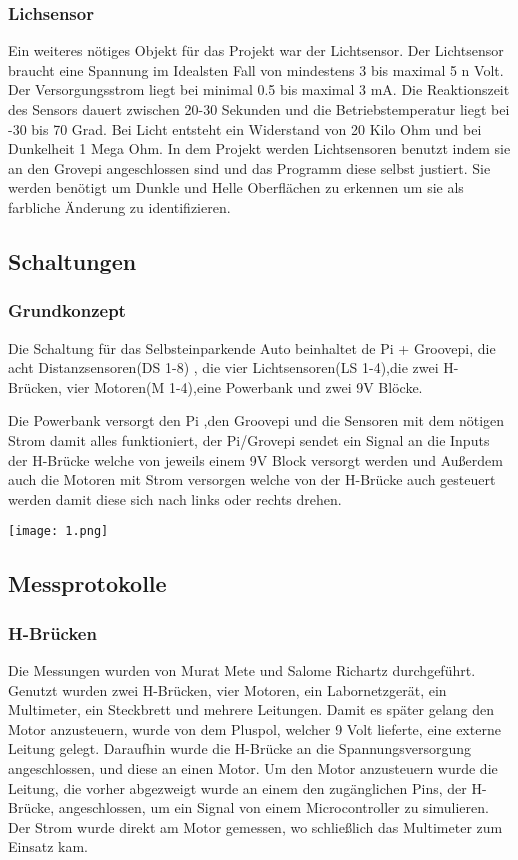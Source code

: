 \documentclass[notitlepage]{report}
\begin{document}
\subsubsection{Lichsensor}

Ein weiteres n\"{o}tiges Objekt f\"{u}r das Projekt war der Lichtsensor. Der Lichtsensor braucht eine Spannung im Idealsten Fall von mindestens 3 bis maximal 5 n Volt. Der Versorgungsstrom liegt bei minimal 0.5 bis maximal 3 mA. Die Reaktionszeit des Sensors dauert zwischen 20-30 Sekunden und die Betriebstemperatur liegt bei -30 bis 70 Grad.  Bei Licht entsteht ein Widerstand von 20 Kilo Ohm und bei Dunkelheit 1 Mega Ohm. In dem Projekt werden Lichtsensoren benutzt indem sie an den Grovepi angeschlossen sind und das Programm diese selbst justiert. Sie werden ben\"{o}tigt um Dunkle und Helle Oberfl\"{a}chen zu erkennen um sie als farbliche \"{A}nderung zu identifizieren. 

\subsection{Schaltungen}

\subsubsection{Grundkonzept}

Die Schaltung f\"{u}r das Selbsteinparkende Auto beinhaltet de Pi + Groovepi, die acht Distanzsensoren(DS 1-8) , die vier Lichtsensoren(LS 1-4),die zwei H-Br\"{u}cken, vier Motoren(M 1-4),eine Powerbank und zwei 9V Bl\"{o}cke.

Die Powerbank versorgt den Pi ,den Groovepi und die Sensoren mit dem n\"{o}tigen Strom damit alles funktioniert, der Pi/Grovepi sendet ein Signal an die Inputs der H-Br\"{u}cke welche von jeweils einem 9V Block versorgt werden und Au{\ss}erdem auch die Motoren mit Strom versorgen welche von der H-Br\"{u}cke auch gesteuert werden damit diese sich nach links oder rechts drehen.

\texttt{[image: 1.png]}

\subsection{Messprotokolle}

\subsubsection{H-Br\"{u}cken}
Die Messungen wurden von Murat Mete und Salome Richartz durchgef\"{u}hrt. Genutzt wurden zwei H-Br\"{u}cken, vier Motoren, ein Labornetzger\"{a}t, ein Multimeter, ein Steckbrett und mehrere Leitungen. Damit es  sp\"{a}ter gelang den Motor anzusteuern, wurde von dem Pluspol, welcher 9 Volt lieferte, eine externe Leitung gelegt. Daraufhin wurde die H-Br\"{u}cke an die Spannungsversorgung angeschlossen, und diese an einen Motor. Um den Motor anzusteuern wurde die Leitung, die vorher abgezweigt wurde an einem den zug\"{a}nglichen Pins, der H-Br\"{u}cke, angeschlossen, um ein Signal von einem Microcontroller zu simulieren. Der Strom wurde direkt am Motor gemessen, wo schlie{\ss}lich das Multimeter zum Einsatz kam.
\end{document}

